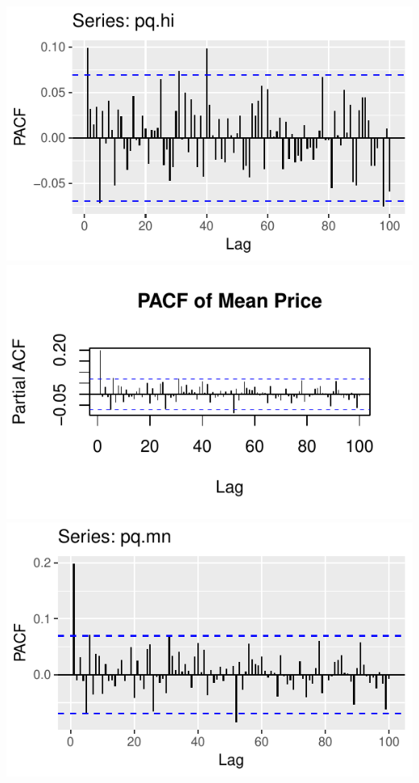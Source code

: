 \documentclass[]{tufte-book}
\begin{document}
\includegraphics{binary-forex-trading-Q1_files/figure-latex/acf-pacf-4}
\includegraphics{binary-forex-trading-Q1_files/figure-latex/acf-pacf-5}
\includegraphics{binary-forex-trading-Q1_files/figure-latex/acf-pacf-6}
\end{document}
